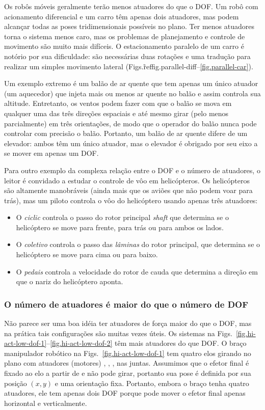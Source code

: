 {Os robôs móveis geralmente terão menos atuadores do que o DOF. Um robô com acionamento diferencial e um carro têm apenas dois atuadores, mas podem alcançar todas as poses tridimensionais possíveis no plano. Ter menos atuadores torna o sistema menos caro, mas os problemas de planejamento e controle de movimento são muito mais difíceis. O estacionamento paralelo de um carro é notório por sua dificuldade: são necessárias duas rotações e uma tradução para realizar um simples movimento lateral (Figs.\~ref{fig.parallel-diff}--\ref{fig.parallel-car}).

Um exemplo extremo é um balão de ar quente que tem apenas um único atuador (um aquecedor) que injeta mais ou menos ar quente no balão e assim controla sua altitude. Entretanto, os ventos podem fazer com que o balão se mova em qualquer uma das três direções espaciais e até mesmo girar (pelo menos parcialmente) em três orientações, de modo que o operador do balão nunca pode controlar com precisão o balão. Portanto, um balão de ar quente difere de um elevador: ambos têm um único atuador, mas o elevador é obrigado por seu eixo a se mover em apenas um DOF.

Para outro exemplo da complexa relação entre o DOF e o número de atuadores, o leitor é convidado a estudar o controle de vôo em helicópteros. Os helicópteros são altamente manobráveis (ainda mais que os aviões que não podem voar para trás), mas um piloto controla o vôo do helicóptero usando apenas três atuadores:
\begin{itemize}
\item O \emph{ciclic} controla o passo do rotor principal \emph{shaft} que determina se o helicóptero se move para frente, para trás ou para ambos os lados.
\item O \emph{coletivo} controla o passo das \emph{lâminas} do rotor principal, que determina se o helicóptero se move para cima ou para baixo.
\item O \emph{pedais} controla a velocidade do rotor de cauda que determina a direção em que o nariz do helicóptero aponta.
\end{itemize}

\subsubsection*{O número de atuadores é maior do que o número de DOF}

Não parece ser uma boa idéia ter atuadores de força maior do que o DOF, mas na prática tais configurações são muitas vezes úteis. Os sistemas na Figs.~\ref{fig.hi-act-low-dof-1}--\ref{fig.hi-act-low-dof-2} têm mais atuadores do que DOF. O braço manipulador robótico na Figs.~\ref{fig.hi-act-low-dof-1} tem quatro elos girando no plano com atuadores (motores) , , ,  nas juntas. Assumimos que o efetor final é fixado ao elo a partir de  e não pode girar, portanto sua pose é definida por sua posição $(x,y)$ e uma orientação fixa. Portanto, embora o braço tenha quatro atuadores, ele tem apenas dois DOF porque pode mover o efetor final apenas horizontal e verticalmente.

}
